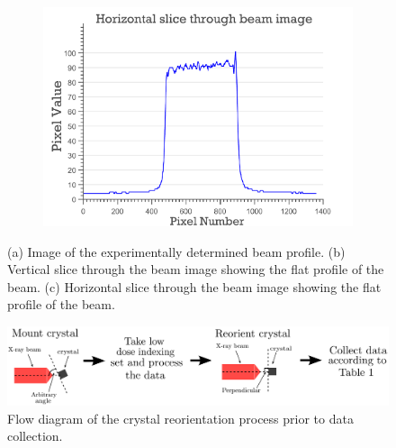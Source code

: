 \begin{figure}
    \ContinuedFloat
    \begin{subfigure}[b]{1.0\textwidth}
        \centering
        \includegraphics[width=\textwidth]{figures/dwd/beamslice_horizontal.pdf}
        \caption{}
        \label{fig:Hamburg beamslice horizontal}
    \end{subfigure}
    \caption[Beam profile at beamline P14, PETRA III, Hamburg.]{(a) Image of the experimentally determined beam profile.
    (b) Vertical slice through the beam image showing the flat profile of the beam.
    (c) Horizontal slice through the beam image showing the flat profile of the beam.}
    \label{fig: Hamburg beam pgm and slice}
\end{figure}

\begin{figure}
  \centering
    \includegraphics[width=1\textwidth]{figures/dwd/initial_indexing.pdf}
    \caption[Flow diagram of the crystal reorientation process prior to data collection at PETRA III.]{Flow diagram of the crystal reorientation process prior to data collection.}
    \label{fig: indexing flow diagram}
\end{figure}

